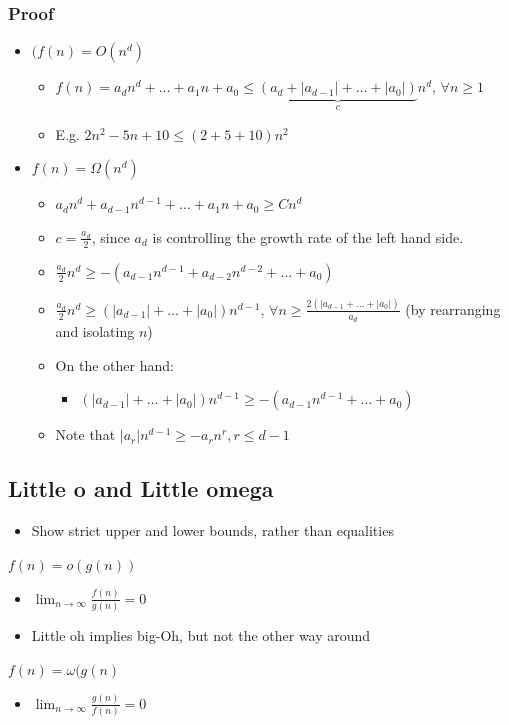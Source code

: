\documentclass[11pt]{article}
\begin{document}
\subsubsection{Proof}
\label{sec:orgf86b1d1}
\begin{itemize}
\item \((f(n)=O(n^d)\)
\begin{itemize}
\item \(f(n)=a_d n^d + \ldots + a_1n + a_0 \leq \underbrace{(a_d+|a_{d-1}|+\ldots+|a_0|)}_c n^d\), \(\forall n\geq 1\)
\item E.g. \(2n^2-5n+10 \leq (2+5+10)n^2\)
\end{itemize}
\item \(f(n)=\Omega(n^d)\)
\begin{itemize}
\item \(a_d n^d + a_{d-1}n^{d-1}+\ldots + a_1 n + a_0 \geq C n^d\)
\item \(c=\frac{a_d}{2}\), since \(a_d\) is controlling the growth rate of the left hand side.
\item \(\frac{a_d}{2}n^d \geq - (a_{d-1}n^{d-1}+a_{d-2}n^{d-2}+\ldots+a_0)\)
\item \(\frac{a_d}{2}n^d \geq (|a_{d-1}|+\ldots+|a_0|)n^{d-1}\), \(\forall n\geq \frac{2(|a_{d-1}+\ldots+|a_0|)}{a_d}\) (by rearranging and isolating \(n\))
\item On the other hand:
\begin{itemize}
\item \((|a_{d-1}|+\ldots+|a_0|)n^{d-1} \geq - (a_{d-1}n^{d-1}+\ldots+a_0)\)
\end{itemize}
\item Note that \(|a_r|n^{d-1} \geq -a_r n^r, r\leq d-1\)
\end{itemize}
\end{itemize}
\subsection{Little o and Little omega}
\label{sec:org2932187}
\begin{itemize}
\item Show strict upper and lower bounds, rather than equalities
\end{itemize}
\(f(n)=o(g(n))\)
\begin{itemize}
\item \(\lim_{n\to \infty}\frac{f(n)}{g(n)}=0\)
\item Little oh implies big-Oh, but not the other way around
\end{itemize}
\(f(n)=\omega (g(n)\)
\begin{itemize}
\item \(\lim_{n\to \infty} \frac{g(n)}{f(n)} = 0\)
\end{itemize}
\end{document}
